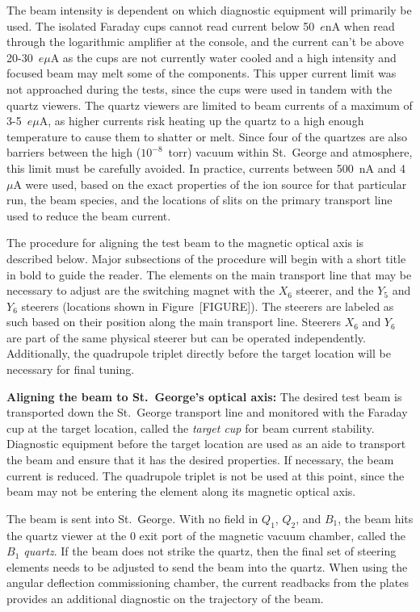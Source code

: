 The beam intensity is dependent on which diagnostic equipment will primarily be
used. The isolated Faraday cups cannot read current below 50~$e$nA when read
through the logarithmic amplifier at the console,
and the current can't be above 20-30~$e\mu$A
as the cups are not currently water cooled and a high intensity and focused
beam may melt
some of the components. This upper current limit was not approached during the
tests, since the cups were used in tandem with the quartz viewers.
The quartz viewers are limited to
beam currents of a maximum of 3-5~$e\mu$A, as higher currents risk heating up
the quartz to
a high enough temperature to cause them to shatter or melt. Since four of the
quartzes
are also barriers between the high ($10^{-8}$~torr) vacuum within St.\ George
and atmosphere, this limit must be carefully avoided. In practice, currents
between 500~nA and 4~$\mu$A were used, based on the exact properties of the ion
source for that particular run, the beam species, and the locations of slits on
the primary transport line used to reduce the beam current.

The procedure for aligning the test beam to the magnetic optical axis is
described below. Major subsections of the procedure will begin with a short
title in bold to guide the reader. The elements on the main transport line that
may be necessary
to adjust are the switching magnet with the $X_6$ steerer, and the $Y_5$ and
$Y_6$ steerers (locations shown in Figure~[FIGURE]). The steerers are labeled
as such based on their position along
the main transport line. Steerers $X_6$ and $Y_6$ are part of the same physical
steerer but can be operated independently. Additionally, the quadrupole triplet
directly before the target location will be necessary for final tuning.

\textbf{Aligning the beam to St.\ George's optical axis:}
The desired test beam is transported down the St.\ George transport line and
monitored with the Faraday cup at the target location, called the
\emph{target cup} for beam current stability. Diagnostic equipment before the
target location are used as an aide to transport the beam and ensure that it
has the desired properties. If necessary, the beam current is reduced. The
quadrupole triplet is not be used at this point, since the beam may not be
entering the element along its magnetic optical axis.

The beam is sent into St.\ George. With no field in $Q_1$, $Q_2$, and $B_1$,
the beam hits the quartz viewer at the 0\degree{} exit port of the magnetic
vacuum chamber, called the \emph{$B_1$ quartz}. If the beam does not strike the
quartz, then the final set of steering elements needs to be adjusted to send
the beam into the quartz. When using the angular deflection commissioning
chamber, the current readbacks from the plates provides an additional
diagnostic on the trajectory of the beam.

